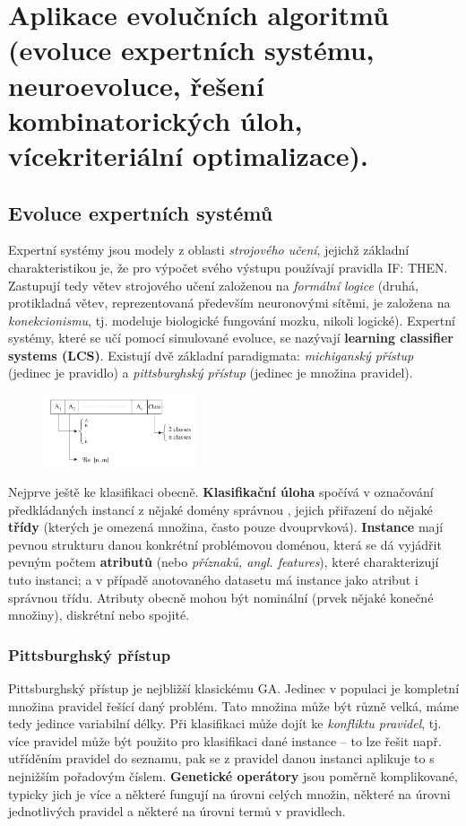 \section{Aplikace evolučních algoritmů (evoluce expertních systému, neuroevoluce, řešení kombinatorických úloh, vícekriteriální optimalizace).}
\subsection{Evoluce expertních systémů}
Expertní systémy jsou modely z oblasti \textit{strojového učení}, jejichž základní charakteristikou je, že pro výpočet svého výstupu používají pravidla IF: THEN. Zastupují tedy větev strojového učení založenou na \textit{formální logice} (druhá, protikladná větev, reprezentovaná především neuronovými sítěmi, je založena na \textit{konekcionismu}, tj. modeluje biologické fungování mozku, nikoli logické). Expertní systémy, které se učí pomocí simulované evoluce, se nazývají \textbf{learning classifier systems (LCS)}. Existují dvě základní paradigmata: \textit{michiganský přístup} (jedinec je pravidlo) a \textit{pittsburghský přístup} (jedinec je množina pravidel).

\begin{figure}
\centering
\includegraphics[width=0.4\textwidth]{img/classification_instance.png}
\end{figure}
Nejprve ještě ke klasifikaci obecně. \textbf{Klasifikační úloha} spočívá v označování předkládaných instancí z nějaké domény správnou , jejich přiřazení do nějaké \textbf{třídy} (kterých je omezená množina, často pouze dvouprvková). \textbf{Instance} mají pevnou strukturu danou konkrétní problémovou doménou, která se dá vyjádřit pevným počtem \textbf{atributů} (nebo \textit{příznaků, angl. features}), které charakterizují tuto instanci; a v případě anotovaného datasetu má instance jako atribut i správnou třídu. Atributy obecně mohou být nominální (prvek nějaké konečné množiny), diskrétní nebo spojité.


\subsubsection{Pittsburghský přístup}
Pittsburghský přístup je nejbližší klasickému GA. Jedinec v populaci je kompletní množina pravidel řešící daný problém. Tato množina může být různě velká, máme tedy jedince variabilní délky. Při klasifikaci může dojít ke \textit{konfliktu pravidel}, tj. více pravidel může být použito pro klasifikaci dané instance -- to lze řešit např. utříděním pravidel do seznamu, pak se z pravidel  danou instanci aplikuje to s nejnižším pořadovým číslem. \textbf{Genetické operátory} jsou poměrně komplikované, typicky jich je více a některé fungují na úrovni celých množin, některé na úrovni jednotlivých pravidel a některé na úrovni termů v pravidlech. 

